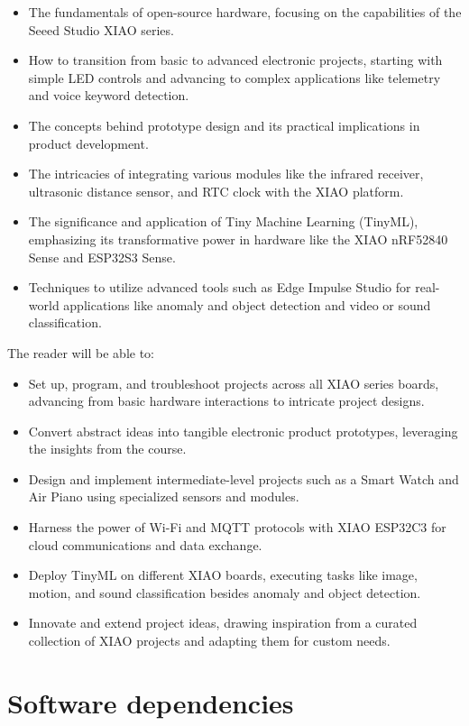 \documentclass[
  letterpaper,
  DIV=11,
  numbers=noendperiod]{scrreprt}
\begin{document}
\begin{itemize}
\item
  The fundamentals of open-source hardware, focusing on the capabilities
  of the Seeed Studio XIAO series.
\item
  How to transition from basic to advanced electronic projects, starting
  with simple LED controls and advancing to complex applications like
  telemetry and voice keyword detection.
\item
  The concepts behind prototype design and its practical implications in
  product development.
\item
  The intricacies of integrating various modules like the infrared
  receiver, ultrasonic distance sensor, and RTC clock with the XIAO
  platform.
\item
  The significance and application of Tiny Machine Learning (TinyML),
  emphasizing its transformative power in hardware like the XIAO
  nRF52840 Sense and ESP32S3 Sense.
\item
  Techniques to utilize advanced tools such as Edge Impulse Studio for
  real-world applications like anomaly and object detection and video or
  sound classification.
\end{itemize}

The reader will be able to:

\begin{itemize}
\item
  Set up, program, and troubleshoot projects across all XIAO series
  boards, advancing from basic hardware interactions to intricate
  project designs.
\item
  Convert abstract ideas into tangible electronic product prototypes,
  leveraging the insights from the course.
\item
  Design and implement intermediate-level projects such as a Smart Watch
  and Air Piano using specialized sensors and modules.
\item
  Harness the power of Wi-Fi and MQTT protocols with XIAO ESP32C3 for
  cloud communications and data exchange.
\item
  Deploy TinyML on different XIAO boards, executing tasks like image,
  motion, and sound classification besides anomaly and object detection.
\item
  Innovate and extend project ideas, drawing inspiration from a curated
  collection of XIAO projects and adapting them for custom needs.
\end{itemize}

\hypertarget{software-dependencies}{%
\section*{Software dependencies}\label{software-dependencies}}
\end{document}
